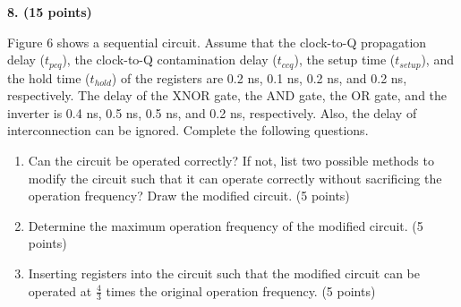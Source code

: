 \documentclass[10pt]{article}
\newcommand{\qheading}[1]{\par\medskip\textbf{#1}\par}
\begin{document}
\newpage
\qheading{8. (15 points)} Figure 6 shows a sequential circuit. Assume that the clock-to-Q propagation delay ($t_{pcq}$), the clock-to-Q contamination delay ($t_{ccq}$), the setup time ($t_{setup}$), and the hold time ($t_{hold}$) of the registers are 0.2 ns, 0.1 ns, 0.2 ns, and 0.2 ns, respectively. The delay of the XNOR gate, the AND gate, the OR gate, and the inverter is 0.4 ns, 0.5 ns, 0.5 ns, and 0.2 ns, respectively. Also, the delay of interconnection can be ignored. Complete the following questions.
\begin{enumerate}[label=(\alph*),leftmargin=7mm]
\item Can the circuit be operated correctly? If not, list two possible methods to modify the circuit such that it can operate correctly without sacrificing the operation frequency? Draw the modified circuit. (5 points)
\item Determine the maximum operation frequency of the modified circuit. (5 points)
\item Inserting registers into the circuit such that the modified circuit can be operated at $\frac43$ times the original operation frequency. (5 points)
\end{enumerate}
\end{document}
